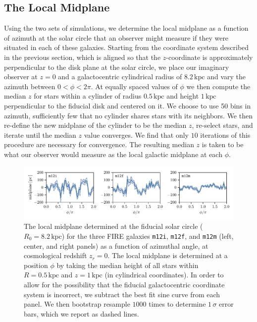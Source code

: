 \documentclass[twocolumn]{aastex62}
\newcommand{\kpc}{\text{kpc}}
\newcommand{\mi}{\texttt{m12i}}
\newcommand{\mf}{\texttt{m12f}}
\newcommand{\mm}{\texttt{m12m}}
\newcommand{\z}{z_r}
\begin{document}
\subsection{The Local Midplane} \label{ssec:local_midplane}
Using the two sets of simulations, we determine the local midplane as a
function of azimuth at the solar circle that an observer might measure if they
were situated in each of these galaxies. Starting from the coordinate system
described in the previous section, which is aligned so that the $z$-coordinate
is approximately perpendicular to the disk plane at the solar circle, we place
our imaginary observer at $z=0$ and a galactocentric cylindrical radius of
$8.2\,\kpc$ and vary the azimuth between $0<\phi<2\pi$. At equally spaced
values of $\phi$ we then compute the median $z$ for stars within a cylinder of
radius $0.5\,\kpc$ and height $1\,\kpc$ perpendicular to the fiducial disk and
centered on it. We choose to use 50 bins in azimuth, sufficiently few that no
cylinder shares stars with its neighbors. We then re-define the new midplane
of the cylinder to be the median $z$, re-select stars, and iterate until the
median $z$ value converges. We find that only $10$ iterations of this
procedure are necessary for convergence. The resulting median $z$ is taken to
be what our observer would measure as the local galactic midplane at each
$\phi$.

\begin{figure}[htb!]
\begin{center}
\includegraphics[width=\textwidth]{fig/midplane_fit.pdf}
\end{center}
\caption{The local midplane determined at the fiducial solar circle
($R_0 = 8.2\,\kpc$) for the three FIRE galaxies \mi{}, \mf{}, and \mm{} (left,
center, and right panels) as a function of azimuthal angle, at cosmological
redshift $\z =0$. The local midplane is determined at a position $\phi$ by
taking the median height of all stars within $R=0.5\,\kpc$ and $z=1\,\kpc$ (in
cylindrical coordinates). In order to allow for the possibility that the
fiducial galactocentric coordinate system is incorrect, we subtract the best
fit sine curve from each panel. We then bootstrap resample $1000$ times to
determine $1\,\sigma $ error bars, which we report as dashed lines.}
\label{fig:midplane}
\end{figure}
\end{document}
